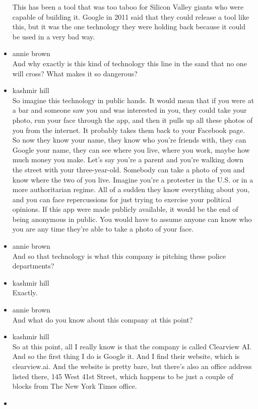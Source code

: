 \begin{itemize}
  This has been a tool that was too taboo for Silicon Valley giants who
  were capable of building it. Google in 2011 said that they could
  release a tool like this, but it was the one technology they were
  holding back because it could be used in a very bad way.
\item
  annie brown\\
  And why exactly is this kind of technology this line in the sand that
  no one will cross? What makes it so dangerous?
\item
  kashmir hill\\
  So imagine this technology in public hands. It would mean that if you
  were at a bar and someone saw you and was interested in you, they
  could take your photo, run your face through the app, and then it
  pulls up all these photos of you from the internet. It probably takes
  them back to your Facebook page. So now they know your name, they know
  who you're friends with, they can Google your name, they can see where
  you live, where you work, maybe how much money you make. Let's say
  you're a parent and you're walking down the street with your
  three-year-old. Somebody can take a photo of you and know where the
  two of you live. Imagine you're a protester in the U.S. or in a more
  authoritarian regime. All of a sudden they know everything about you,
  and you can face repercussions for just trying to exercise your
  political opinions. If this app were made publicly available, it would
  be the end of being anonymous in public. You would have to assume
  anyone can know who you are any time they're able to take a photo of
  your face.
\item
  annie brown\\
  And so that technology is what this company is pitching these police
  departments?
\item
  kashmir hill\\
  Exactly.
\item
  annie brown\\
  And what do you know about this company at this point?
\item
  kashmir hill\\
  So at this point, all I really know is that the company is called
  Clearview AI. And so the first thing I do is Google it. And I find
  their website, which is clearview.ai. And the website is pretty bare,
  but there's also an office address listed there, 145 West 41st Street,
  which happens to be just a couple of blocks from The New York Times
  office.
\item

\end{itemize}
